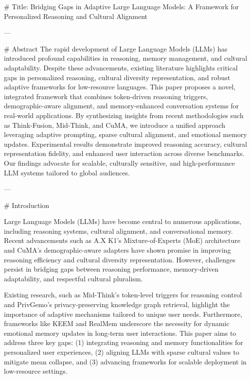 # Title: Bridging Gaps in Adaptive Large Language Models: A Framework for Personalized Reasoning and Cultural Alignment

---

# Abstract
The rapid development of Large Language Models (LLMs) has introduced profound capabilities in reasoning, memory management, and cultural adaptability. Despite these advancements, existing literature highlights critical gaps in personalized reasoning, cultural diversity representation, and robust adaptive frameworks for low-resource languages. This paper proposes a novel, integrated framework that combines token-driven reasoning triggers, demographic-aware alignment, and memory-enhanced conversation systems for real-world applications. By synthesizing insights from recent methodologies such as Think-Fusion, Mid-Think, and CuMA, we introduce a unified approach leveraging adaptive prompting, sparse cultural alignment, and emotional memory updates. Experimental results demonstrate improved reasoning accuracy, cultural representation fidelity, and enhanced user interaction across diverse benchmarks. Our findings advocate for scalable, culturally sensitive, and high-performance LLM systems tailored to global audiences.

---

# Introduction

Large Language Models (LLMs) have become central to numerous applications, including reasoning systems, cultural alignment, and conversational memory. Recent advancements such as A.X K1's Mixture-of-Experts (MoE) architecture and CuMA's demographic-aware adapters have shown promise in improving reasoning efficiency and cultural diversity representation. However, challenges persist in bridging gaps between reasoning performance, memory-driven adaptability, and respectful cultural pluralism.

Existing research, such as Mid-Think's token-level triggers for reasoning control and PrivGemo's privacy-preserving knowledge graph retrieval, highlight the importance of adaptive mechanisms tailored to unique user needs. Furthermore, frameworks like KEEM and RealMem underscore the necessity for dynamic emotional memory updates in long-term user interactions. This paper aims to address three key gaps: (1) integrating reasoning and memory functionalities for personalized user experiences, (2) aligning LLMs with sparse cultural values to mitigate mean collapse, and (3) advancing frameworks for scalable deployment in low-resource settings.

